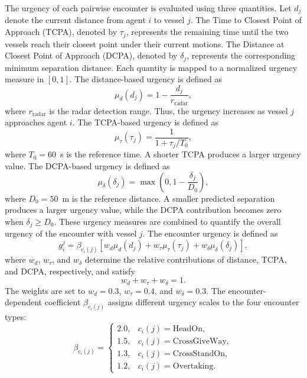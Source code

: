 \documentclass[final,5p,times,twocolumn]{elsarticle}
\begin{document}
{The urgency of each pairwise encounter is evaluated using three quantities. Let $d_j$ denote the current distance from agent $i$ to vessel $j$. The Time to Closest Point of Approach (TCPA), denoted by
$\tau_j$, represents the remaining time until the two vessels reach their closest point under their current motions. The Distance at Closest Point of Approach (DCPA), denoted by $\delta_j$, represents the corresponding minimum separation distance.
Each quantity is mapped to a normalized urgency measure in $[0,1]$.
The distance-based urgency is defined as
\begin{equation}
\mu_d(d_j)=1-\frac{d_j}{r_{\mathrm{radar}}},
\end{equation}
where $r_{\mathrm{radar}}$ is the radar detection range. Thus, the
urgency increases as vessel $j$ approaches agent $i$.
The TCPA-based urgency is defined as
\begin{equation}
\mu_\tau(\tau_j)=\frac{1}{1+\tau_j/T_0},
\end{equation}
where $T_0=60$~s is the reference time. A shorter TCPA produces a
larger urgency value.
The DCPA-based urgency is defined as
\begin{equation}
\mu_\delta(\delta_j)=\max\left(0,1-\frac{\delta_j}{D_0}\right),
\end{equation}
where $D_0=50$~m is the reference distance. A smaller predicted
separation produces a larger urgency value, while the DCPA contribution
becomes zero when $\delta_j\geq D_0$.
These urgency measures are combined to quantify the overall urgency
of the encounter with vessel $j$. The encounter urgency is defined as
\begin{equation}
g_i^j=\beta_{c_i(j)}\left[w_d\mu_d(d_j)+w_\tau\mu_\tau(\tau_j)+w_\delta\mu_\delta(\delta_j)\right],
\label{eq:urgency}
\end{equation}
where $w_d$, $w_\tau$, and $w_\delta$ determine the relative
contributions of distance, TCPA, and DCPA, respectively, and satisfy
\begin{equation}
w_d+w_\tau+w_\delta=1.
\end{equation}
The weights are set to $w_d=0.3$, $w_\tau=0.4$, and
$w_\delta=0.3$. The encounter-dependent coefficient
$\beta_{c_i(j)}$ assigns different urgency scales to the four encounter
types:
\begin{equation}
\beta_{c_i(j)}
=\begin{cases}
2.0, & c_i(j)=\mathrm{HeadOn},\\
1.5, & c_i(j)=\mathrm{CrossGiveWay},\\
1.3, & c_i(j)=\mathrm{CrossStandOn},\\
1.2, & c_i(j)=\mathrm{Overtaking}.
\end{cases}
\label{eq:beta_colregs}
\end{equation}

}
\end{document}
